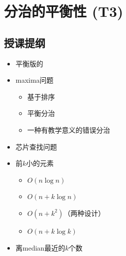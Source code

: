 \chapter{分治的平衡性 (T3)}

\section*{授课提纲}

\nid 
\begin{itemize}
    \item 平衡版的
    \item maxima问题
    \begin{itemize}
        \item 基于排序
        \item 平衡分治
        \item 一种有教学意义的错误分治
    \end{itemize}
    \item 芯片查找问题
    \item 前$k$小的元素
    \begin{itemize}
        \item $O(n\log n)$
        \item $O(n+ k\log n)$
        \item $O(n+k^2)$（两种设计）
        \item $O(n+k\log k)$
    \end{itemize}
    \item 离median最近的$k$个数
\end{itemize}